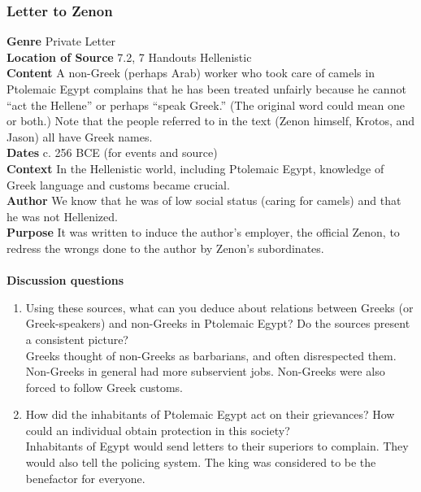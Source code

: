 \documentclass{article}
\begin{document}
\subsubsection*{Letter to Zenon}
\textbf{Genre}
Private Letter \\
\textbf{Location of Source}
7.2, 7 Handouts Hellenistic \\
\textbf{Content}
A non-Greek (perhaps Arab) worker who took care of camels in Ptolemaic Egypt complains
that he has been treated unfairly because he cannot “act the Hellene” or perhaps “speak
Greek.”  (The original word could mean one or both.)  Note that the people referred to in the
text (Zenon himself, Krotos, and Jason) all have Greek names. \\
\textbf{Dates}
c. 256 BCE (for events and source) \\
\textbf{Context}
In the Hellenistic world, including Ptolemaic Egypt, knowledge of Greek language and
customs became crucial. \\
\textbf{Author}
We know that he was of low social status (caring for camels) and that he was not Hellenized. \\
\textbf{Purpose}
It was written to induce the author’s employer, the official Zenon, to redress the wrongs
done to the author by Zenon’s subordinates. \\
\\
\textbf{Discussion questions}
\begin{enumerate}
  \item Using these sources, what can you deduce about relations between Greeks (or
  Greek-speakers) and non-Greeks in Ptolemaic Egypt? Do the sources present a consistent picture? \\
  Greeks thought of non-Greeks as barbarians, and often disrespected them. Non-Greeks in
  general had more subservient jobs. Non-Greeks were also forced to follow Greek customs.
  \item How did the inhabitants of Ptolemaic Egypt act on their grievances? How could an
  individual obtain protection in this society? \\
  Inhabitants of Egypt would send letters to their superiors to complain. They would also tell
  the policing system. The king was considered to be the benefactor for everyone.
\end{enumerate}
\end{document}
